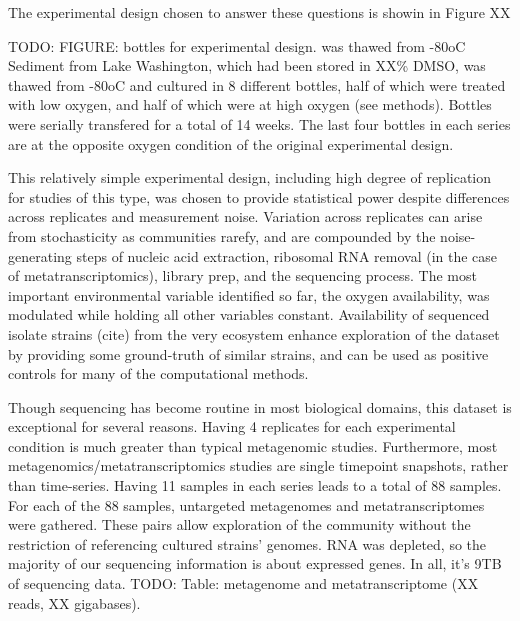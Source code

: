 The experimental design chosen to answer these questions is showin in Figure XX

TODO: FIGURE: bottles for experimental design.   was thawed from -80oC
Sediment from Lake Washington, which had been stored in XX\% DMSO, was thawed from -80oC and cultured in 8 different bottles, half of which were treated with low oxygen, and half of which were at high oxygen (see methods).  Bottles were serially transfered for a total of 14 weeks.  The last four bottles in each series are at the opposite oxygen condition of the original experimental design.

This relatively simple experimental design, including high degree of replication for studies of this type, was chosen to provide statistical power despite differences across replicates and measurement noise.
Variation across replicates can arise from stochasticity as communities rarefy, and are compounded by the noise-generating steps of nucleic acid extraction, ribosomal RNA removal (in the case of metatranscriptomics), library prep, and the sequencing process.
The most important environmental variable identified so far, the oxygen availability, was modulated while holding all other variables constant.
Availability of sequenced isolate strains (cite) from the very ecosystem enhance exploration of the dataset by providing some ground-truth of similar strains, and can be used as positive controls for many of the computational methods.

Though sequencing has become routine in most biological domains, this dataset is exceptional for several reasons.
Having 4 replicates for each experimental condition is much greater than typical metagenomic studies.
Furthermore, most metagenomics/metatranscriptomics studies are single timepoint snapshots, rather than time-series.
Having 11 samples in each series leads to a total of 88 samples.
For each of the 88 samples, untargeted metagenomes and metatranscriptomes were gathered.
These pairs allow exploration of the community without the restriction of referencing cultured strains' genomes.
RNA was depleted, so the majority of our sequencing information is about expressed genes.
In all, it's 9TB of sequencing data.  TODO: Table: metagenome and metatranscriptome (XX reads, XX gigabases).


